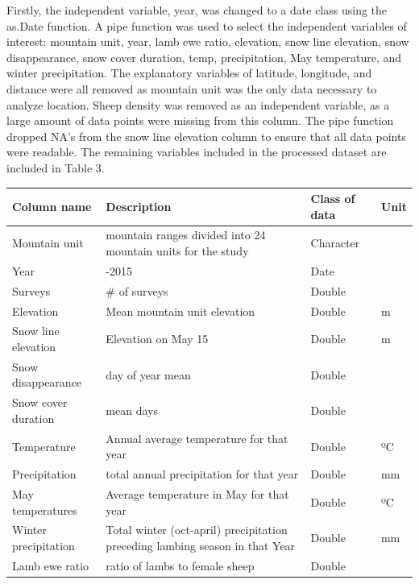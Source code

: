 \documentclass[
  12pt,
]{article}
\begin{document}
Firstly, the independent variable, year, was changed to a date class
using the as.Date function. A pipe function was used to select the
independent variables of interest: mountain unit, year, lamb ewe ratio,
elevation, snow line elevation, snow disappearance, snow cover duration,
temp, precipitation, May temperature, and winter precipitation. The
explanatory variables of latitude, longitude, and distance were all
removed as mountain unit was the only data necessary to analyze
location. Sheep density was removed as an independent variable, as a
large amount of data points were missing from this column. The pipe
function dropped NA's from the snow line elevation column to ensure that
all data points were readable. The remaining variables included in the
processed dataset are included in Table 3.

\begin{longtable}[]{@{}
  >{\raggedright\arraybackslash}p{}
  >{\raggedright\arraybackslash}p{}
  >{\raggedright\arraybackslash}p{}
  >{\raggedright\arraybackslash}p{}@{}}
\toprule
Column name & Description & Class of data & Unit \\
\midrule
\endhead
Mountain unit & 14 mountain ranges divided into 24 mountain units for
the study & Character & \\
Year & 2000-2015 & Date & \\
Surveys & \# of surveys & Double & \\
Elevation & Mean mountain unit elevation & Double & m \\
Snow line elevation & Elevation on May 15 & Double & m \\
Snow disappearance & day of year mean & Double & \\
Snow cover duration & mean days & Double & \\
Temperature & Annual average temperature for that year & Double & ºC \\
Precipitation & total annual precipitation for that year & Double &
mm \\
May temperatures & Average temperature in May for that year & Double &
ºC \\
Winter precipitation & Total winter (oct-april) precipitation preceding
lambing season in that Year & Double & mm \\
Lamb ewe ratio & ratio of lambs to female sheep & Double & \\
\bottomrule
\end{longtable}
\end{document}
